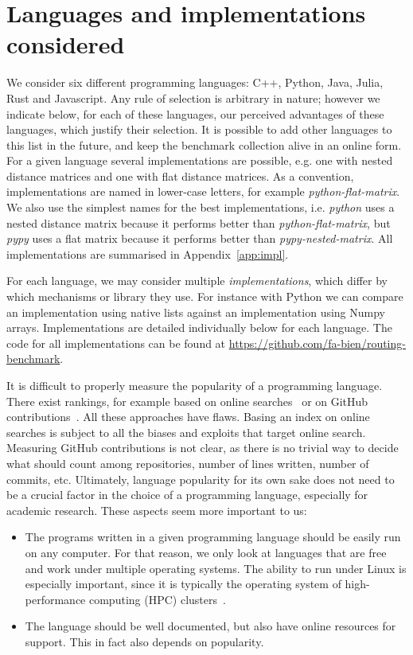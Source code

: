 \documentclass[11pt,a4paper,notitlepage]{article}
\begin{document}
\section{Languages and implementations considered}
We consider six different programming languages: C++, Python, Java,
Julia, Rust and Javascript. Any rule of selection
is arbitrary in nature; however we indicate below, for each of these
languages, our perceived advantages of these languages, which justify
their selection. It is possible to add other languages to this list in
the future, and keep the benchmark collection alive in an online form.
For a given language several implementations are possible, e.g. one
with nested distance matrices and one with flat distance matrices. As
a convention, implementations are named in lower-case letters, for
example \emph{python-flat-matrix}. We also use the simplest names for
the best implementations, i.e. \emph{python} uses a nested distance
matrix because it performs better than \emph{python-flat-matrix}, but
\emph{pypy} uses a flat matrix because it performs better than
\emph{pypy-nested-matrix}. All implementations are summarised in
Appendix~\ref{app:impl}.

For each language, we may consider multiple \emph{implementations},
which differ by which mechanisms or library they use. For
instance with Python we can compare an implementation using native
lists against an implementation using Numpy arrays. Implementations are
detailed individually below for each language. The code for all
implementations can be found at
\url{https://github.com/fa-bien/routing-benchmark}.

It is difficult to properly measure the popularity of a programming
language. There exist rankings, for example based on online
searches~\cite{TIOBE} or on GitHub contributions~\cite{octoverse}. All
these approaches have flaws. Basing an index on online searches is
subject to all the biases and exploits that target online
search. Measuring GitHub contributions is not clear, as
there is no trivial way to decide what should count among
repositories, number of lines written, number of commits,
etc. Ultimately, language popularity for its own sake does not need to
be a crucial factor in the choice of a programming language, especially for
academic research. These aspects seem more important to us:
\begin{itemize}
\item The programs written in a given programming language should be
  easily run on any computer. For that reason, we only look at
  languages that are free and work under multiple operating
  systems. The ability to run under Linux is especially important,
  since it is typically the operating system of high-performance
  computing (HPC) clusters~\cite{top500}.
\item The language should be well documented, but also have online
  resources for support. This in fact also depends on popularity.
\end{itemize}
\end{document}
